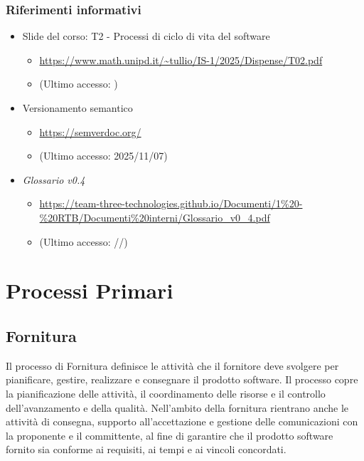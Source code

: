 \documentclass[a4paper,12pt]{article}
\begin{document}
        \subsubsection{Riferimenti informativi}
            \label{sec:refinf}
            \begin{itemize}
                \item Slide del corso: T2 - Processi di ciclo di vita del software
                \begin{itemize}
                    \item \url{https://www.math.unipd.it/~tullio/IS-1/2025/Dispense/T02.pdf} 
                    \item[] (Ultimo accesso: )
                \end{itemize}
                \item Versionamento semantico
                \begin{itemize}
                    \item \url{https://semverdoc.org/}
                    \item[] (Ultimo accesso: 2025/11/07)
                \end{itemize}
                \item \textit{Glossario v0.4}
                \begin{itemize}
                    \item \url{https://team-three-technologies.github.io/Documenti/1%20-%20RTB/Documenti%20interni/Glossario_v0_4.pdf}
                    \item[] (Ultimo accesso: //)
                \end{itemize}
            \end{itemize}
            
\newpage

\section{Processi Primari}
    \subsection{Fornitura}
        Il processo di Fornitura definisce le attività che il fornitore deve svolgere per pianificare, gestire, realizzare e consegnare il prodotto software.
        Il processo copre la pianificazione delle attività, il coordinamento delle risorse e il controllo dell'avanzamento e della qualità.
        Nell'ambito della fornitura rientrano anche le attività di consegna, supporto all'accettazione e gestione delle comunicazioni con la proponente e il committente, al fine di garantire che il prodotto software fornito sia conforme ai requisiti, ai tempi e ai vincoli concordati.
        
\end{document}
